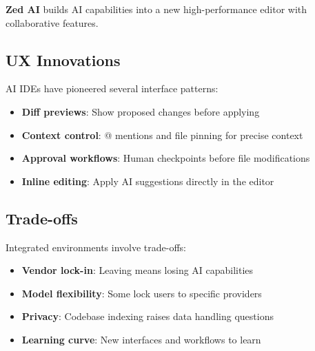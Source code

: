 \textbf{Zed AI} builds AI capabilities into a new high-performance editor with collaborative features.

\subsection{UX Innovations}

AI IDEs have pioneered several interface patterns:
\begin{itemize}
    \item \textbf{Diff previews}: Show proposed changes before applying
    \item \textbf{Context control}: @ mentions and file pinning for precise context
    \item \textbf{Approval workflows}: Human checkpoints before file modifications
    \item \textbf{Inline editing}: Apply AI suggestions directly in the editor
\end{itemize}

\subsection{Trade-offs}

Integrated environments involve trade-offs:
\begin{itemize}
    \item \textbf{Vendor lock-in}: Leaving means losing AI capabilities
    \item \textbf{Model flexibility}: Some lock users to specific providers
    \item \textbf{Privacy}: Codebase indexing raises data handling questions
    \item \textbf{Learning curve}: New interfaces and workflows to learn
\end{itemize}
